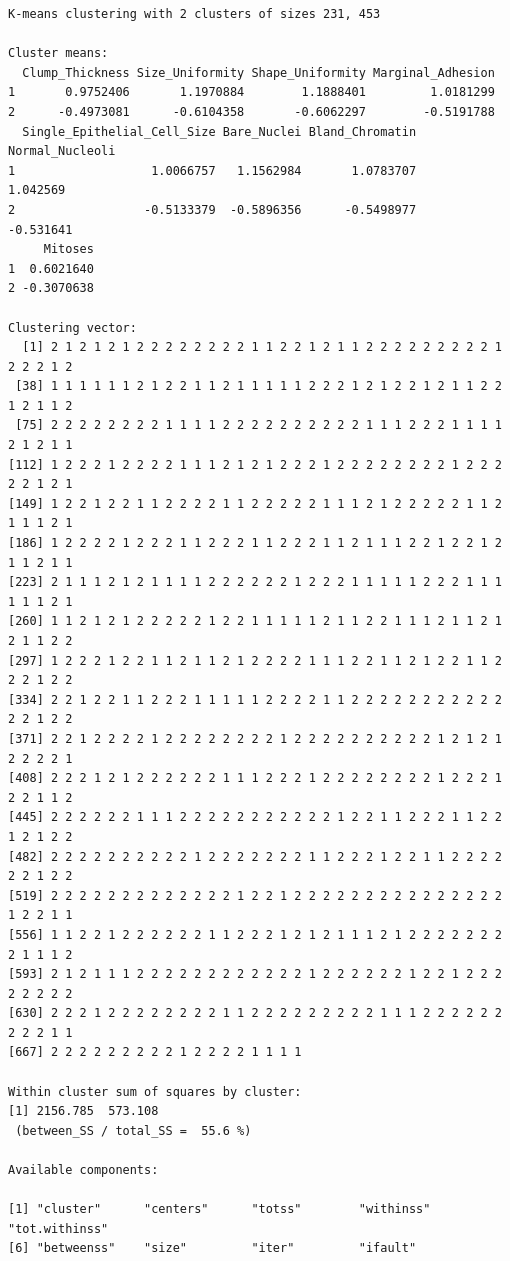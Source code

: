 \documentclass[
  letterpaper,
  DIV=11,
  numbers=noendperiod]{scrreprt}
\begin{document}
\begin{verbatim}
K-means clustering with 2 clusters of sizes 231, 453

Cluster means:
  Clump_Thickness Size_Uniformity Shape_Uniformity Marginal_Adhesion
1       0.9752406       1.1970884        1.1888401         1.0181299
2      -0.4973081      -0.6104358       -0.6062297        -0.5191788
  Single_Epithelial_Cell_Size Bare_Nuclei Bland_Chromatin Normal_Nucleoli
1                   1.0066757   1.1562984       1.0783707        1.042569
2                  -0.5133379  -0.5896356      -0.5498977       -0.531641
     Mitoses
1  0.6021640
2 -0.3070638

Clustering vector:
  [1] 2 1 2 1 2 1 2 2 2 2 2 2 2 2 1 1 2 2 1 2 1 1 2 2 2 2 2 2 2 2 2 1 2 2 2 1 2
 [38] 1 1 1 1 1 1 2 1 2 2 1 1 2 1 1 1 1 1 2 2 2 1 2 1 2 2 1 2 1 1 2 2 1 2 1 1 2
 [75] 2 2 2 2 2 2 2 2 1 1 1 1 2 2 2 2 2 2 2 2 2 2 1 1 1 2 2 2 1 1 1 1 2 1 2 1 1
[112] 1 2 2 2 1 2 2 2 2 1 1 1 2 1 2 1 2 2 2 1 2 2 2 2 2 2 2 2 1 2 2 2 2 2 1 2 1
[149] 1 2 2 1 2 2 1 1 2 2 2 2 1 1 2 2 2 2 2 1 1 1 2 1 2 2 2 2 2 1 1 2 1 1 1 2 1
[186] 1 2 2 2 2 1 2 2 2 1 1 2 2 2 1 1 2 2 2 1 1 2 1 1 1 2 2 1 2 2 1 2 1 1 2 1 1
[223] 2 1 1 1 2 1 2 1 1 1 1 2 2 2 2 2 2 1 2 2 2 1 1 1 1 1 2 2 2 1 1 1 1 1 1 2 1
[260] 1 1 2 1 2 1 2 2 2 2 2 1 2 2 1 1 1 1 1 2 1 1 2 2 1 1 1 2 1 1 2 1 2 1 1 2 2
[297] 1 2 2 2 1 2 2 1 1 2 1 1 2 1 2 2 2 2 1 1 1 2 2 1 1 2 1 2 2 1 1 2 2 2 1 2 2
[334] 2 2 1 2 2 1 1 2 2 2 1 1 1 1 1 2 2 2 2 1 1 2 2 2 2 2 2 2 2 2 2 2 2 2 1 2 2
[371] 2 2 1 2 2 2 2 1 2 2 2 2 2 2 2 2 1 2 2 2 2 2 2 2 2 2 2 1 2 1 2 1 2 2 2 2 1
[408] 2 2 2 1 2 1 2 2 2 2 2 2 1 1 1 2 2 2 1 2 2 2 2 2 2 2 2 1 2 2 2 1 2 2 1 1 2
[445] 2 2 2 2 2 2 1 1 1 2 2 2 2 2 2 2 2 2 2 2 1 2 2 1 1 2 2 2 1 1 2 2 1 2 1 2 2
[482] 2 2 2 2 2 2 2 2 2 2 1 2 2 2 2 2 2 2 1 1 2 2 2 1 2 2 1 1 2 2 2 2 2 2 1 2 2
[519] 2 2 2 2 2 2 2 2 2 2 2 2 2 1 2 2 1 2 2 2 2 2 2 2 2 2 2 2 2 2 2 2 1 2 2 1 1
[556] 1 1 2 2 1 2 2 2 2 2 2 1 1 2 2 2 1 2 1 2 1 1 1 2 1 2 2 2 2 2 2 2 2 1 1 1 2
[593] 2 1 2 1 1 1 2 2 2 2 2 2 2 2 2 2 2 2 1 2 2 2 2 2 2 1 2 2 1 2 2 2 2 2 2 2 2
[630] 2 2 2 1 2 2 2 2 2 2 2 2 1 1 2 2 2 2 2 2 2 2 2 1 1 1 2 2 2 2 2 2 2 2 2 1 1
[667] 2 2 2 2 2 2 2 2 2 1 2 2 2 2 1 1 1 1

Within cluster sum of squares by cluster:
[1] 2156.785  573.108
 (between_SS / total_SS =  55.6 %)

Available components:

[1] "cluster"      "centers"      "totss"        "withinss"     "tot.withinss"
[6] "betweenss"    "size"         "iter"         "ifault"      
\end{verbatim}
\end{document}
